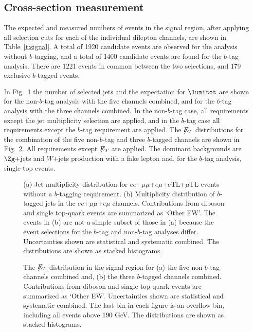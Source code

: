 \subsection{Cross-section measurement}
\label{s:nobtagging}

The expected and measured numbers of events in the signal region,
after applying all selection cuts for each of the individual
dilepton channels, are shown in Table~\ref{t:signal}. A total of
1920 candidate events are observed for the analysis without
$b$-tagging, and a total of 1400 candidate events are found for the
$b$-tag analysis.  There are 1221 events in common between the two
selections, and 179 exclusive $b$-tagged events.

In Fig.~\ref{f:ll_njets} the number of selected jets and the
expectation for $\lumitot$ are shown for the non-$b$-tag analysis
with the five channels combined, and for the $b$-tag analysis with
the three channels combined. In the non-$b$-tag case, all
requirements except the jet multiplicity selection are applied, and
in the $b$-tag case all requirements except the $b$-tag requirement
are applied. The $\not\!\!{E_{T}}$ distributions for the combination of the
five non-$b$-tag and three $b$-tagged channels are
shown in Fig.~\ref{f:ll_met_ht}. All requirements except $\not\!\!{E_{T}}$ are
applied.
The dominant backgrounds are $\Zg +$jets and $W$+jets
production with a fake lepton and, for the $b$-tag analysis,
single-top events.

\begin{figure*}
  \centering
  \caption{ (a) Jet multiplicity distribution for
$ee$+$\mu\mu$+$e\mu$+$e$TL+$\mu$TL events without a $b$-tagging requirement. (b)
 Multiplicity distribution of $b$-tagged jets in the $ee$+$\mu\mu$+$e\mu$ channels. Contributions from diboson and
single top-quark events are summarized as `Other EW'. The
events in (b) are not a simple subset of those in (a) because the
event selections for the $b$-tag and non-$b$-tag analyses differ.
Uncertainties shown are statistical and systematic combined. The
distributions are shown as stacked histograms.}
  \label{f:ll_njets}
\end{figure*}

\begin{figure*}
  \centering
  \caption{
The $\not\!\!{E_{T}}$ distribution in the signal region for (a) the five
non-$b$-tag channels combined and, (b) the three $b$-tagged channels
combined.  Contributions from diboson and single top-quark events
are summarized as `Other EW'. Uncertainties shown are statistical
and systematic combined. The last bin in each figure is an
overflow bin, including all events above 190 GeV. The distributions
are shown as stacked histograms.}
  \label{f:ll_met_ht}
\end{figure*}

